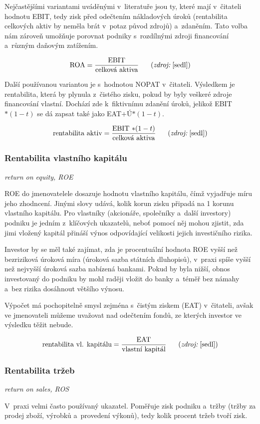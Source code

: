 Nejčastějšími variantami uváděnými v~literatuře jsou ty, které mají v~čitateli hodnotu EBIT, tedy zisk před odečtením nákladových úroků (rentabilita celkových aktiv by neměla brát v~potaz původ zdrojů) a~zdaněním. Tato volba nám zároveň umožňuje porovnat podniky s~rozdílnými zdroji financování a~různým daňovým zatížením.

$$\vz{ROA}{EBIT}{celková aktiva} \scite{sedl}$$

Další používanou variantou je s~hodnotou NOPAT v~čitateli. Výsledkem je rentabilita, která by plynula z~čistého zisku, pokud by byly veškeré zdroje financování vlastní. Dochází zde k~fiktivnímu zdanění úroků, jelikož EBIT$*(1-t)$ se dá zapsat také jako EAT$+$Ú$*(1-t)$.

$$\vz{rentabilita aktiv}{EBIT $*(1-t)$}{celková aktiva} \scite{sedl}$$ 


\subsubsection{Rentabilita vlastního kapitálu}
\textit{return on equity, ROE}

ROE do jmenovatelele dosazuje hodnotu vlastního kapitálu, čímž vyjadřuje míru jeho zhodncení. Jinými slovy udává, kolik korun zisku připadá na 1 korunu vlastního kapitálu. Pro vlastníky (akcionáře, společníky a~další investory) podniku je jedním z~klíčových ukazatelů, neboť pomocí něj mohou zjistit, zda jimi vložený kapitál přináší výnos odpovídající velikosti jejich investičního rizika.\cite{sedl}

Investor by se měl také zajímat, zda je procentuální hodnota ROE vyšší než bezriziková úroková míra (úroková sazba státních dluhopisů), v~praxi spíše vyšší než nejvyšší úroková sazba nabízená bankami. Pokud by byla nižší, obnos investovaný do podniku by mohl raději vložit do banky a~téměř bez námahy a~bez rizika dosáhnout většího výnosu.

Výpočet má pochopitelně smysl zejména s~čistým ziskem (EAT) v~čitateli, avšak ve jmenovateli můžeme uvažovat nad odečtením fondů, ze kterých investor ve výsledku těžit nebude.

$$\vz{rentabilita vl. kapitálu}{EAT}{vlastní kapitál} \scite{sedl}$$ 


\subsubsection{Rentabilita tržeb}
\textit{return on sales, ROS}

V~praxi velmi často používaný ukazatel. Poměřuje zisk podniku a~tržby (tržby za prodej zboží, výrobků a~provedení výkonů), tedy kolik procent tržeb tvoří zisk.

